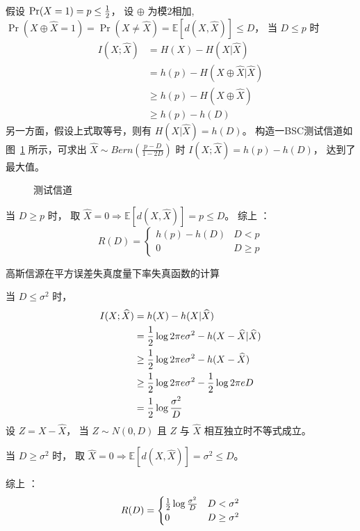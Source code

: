 \documentclass{article}
\def\E{\mathbb{E}}
\begin{document}
假设 $ \Pr(X = 1) = p \leq { 1 \over 2} $，
设 $\oplus $ 为模2相加, $\Pr(X \oplus \widehat{X} = 1) = \Pr (X \neq \widehat{X}) = \E[d(X,\widehat{X})] \leq D$，
当 $ D \leq p $ 时
\begin{align*}
I (X; \widehat{X}) & = H(X) - H(X| \widehat{X}) \\
&  = h(p) - H(X \oplus \widehat{X} | \widehat{X}) \\
& \geq h(p) - H(X \oplus \widehat{X}) \\
& \geq h(p) - h(D) 
\end{align*}
另一方面，假设上式取等号，则有 $ H(X | \widehat{X} ) = h(D) $。
构造一BSC测试信道如图~\ref{fig:F} 所示，可求出 $ \widehat{X} \sim Bern( \frac{ p - D }{ 1 - 2D} ) $ 时 $ I(X; \widehat{X}) = h(p) - h(D) $，
达到了最大值。
\begin{figure}[!ht]
\begin{center}
\end{center}
\caption{测试信道}\label{fig:F}%
\end{figure}
当 $ D \geq p $ 时， 取 $ \widehat{X} = 0 \Rightarrow \E[d(X,\widehat{X})] = p \leq D $。
综上 ： $$ R(D) = \begin{cases} h(p) - h(D) & D < p \\ 0 & D \geq p \end{cases} $$

高斯信源在平方误差失真度量下率失真函数的计算

当 $ D \leq \sigma^2 $ 时，
\begin{align*}
I(X; \widehat{X}) & = h(X) - h(X | \widehat{X} ) \\
	& = { 1 \over 2} \log 2\pi e \sigma^2 -  h(X - \widehat{X} | \widehat{X} ) \\
	& \geq { 1 \over 2} \log 2\pi e \sigma^2 - h(X - \widehat{X}) \\
	& \geq { 1 \over 2} \log 2\pi e \sigma^2 - { 1 \over 2} \log 2 \pi e D  \\
	& = { 1 \over 2} \log \frac{\sigma^2}{D}
\end{align*}
设 $Z = X - \widehat{X}$， 当 $ Z \sim N(0, D)$ 且 $Z$ 与 $\widehat{X}$ 相互独立时不等式成立。

当 $ D \geq \sigma^2 $ 时， 取 $ \widehat{X} = 0 \Rightarrow \E[d(X,\widehat{X})] = \sigma^2 \leq D $。

综上 ： $$ R(D) = \begin{cases} {1 \over 2} \log \frac{\sigma^2}{D} & D < \sigma^2 \\ 0 & D \geq \sigma^2 \end{cases} $$
\end{document}
